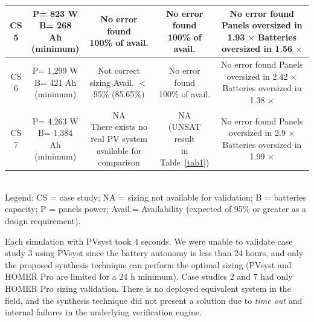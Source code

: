 \documentclass[runningheads]{llncs}
\begin{document}
\begin{table}
\begin{scriptsize}
\begin{tabular}{c|c|c|c|c}
\hline
CS 5 & \makecell{P= 823 W\\B= 268 Ah\\(minimum)} & \makecell{No error found \\100\% of avail.} & \makecell{No error found \\100\% of avail.} & \makecell{No error found\\Panels oversized in 1.93 $\times$\\Batteries oversized in 1.56 $\times$}\\
\hline
CS 6 & \makecell{P= 1,299 W\\B= 421 Ah\\(minimum)} & \makecell{Not correct sizing \\Avail. $<$ 95\%\\(85.65\%)} & \makecell{No error found \\100\% of avail.} & \makecell{No error found\\Panels oversized in 2.42 $\times$\\Batteries oversized in 1.38 $\times$}\\
\hline
CS 7 & \makecell{P= 4,263 W\\B= 1,384 Ah\\(minimum)} & \makecell{NA\\There exists no real PV system\\available for comparison} & \makecell{NA \\(UNSAT result\\in Table~\ref{tab1})} & \makecell{No error found\\Panels oversized in 2.9 $\times$\\Batteries oversized in 1.99 $\times$}\\
\hline
\hline
\end{tabular}
\\Legend: CS = case study; NA = sizing not available for validation; B = batteries capacity; P = panels power; Avail.= Availability (expected of 95\% or greater as a design requirement).
\end{scriptsize}
\end{table}

Each simulation with PVsyst took $4$ seconds. We were unable to validate case study $3$ using PVsyst since the battery autonomy is less than 24 hours, and only the proposed synthesis technique can perform the optimal sizing (PVsyst and HOMER Pro are limited for a $24$ h minimum). Case studies $2$ and $7$ had only HOMER Pro sizing validation. There is no deployed equivalent system in the field, and the synthesis technique did not present a solution due to \textit{time out} and internal failures in the underlying verification engine. %
\end{document}
